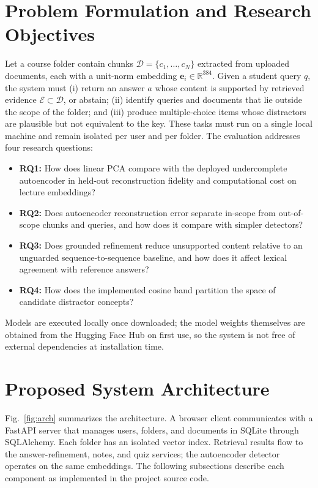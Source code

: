 \documentclass[conference]{IEEEtran}
\begin{document}
\section{Problem Formulation and Research Objectives}
Let a course folder contain chunks $\mathcal{D}=\{c_1,\dots,c_N\}$ extracted from uploaded documents, each with a unit-norm embedding $\mathbf{e}_i\in\mathbb{R}^{384}$. Given a student query $q$, the system must (i) return an answer $a$ whose content is supported by retrieved evidence $\mathcal{E}\subset\mathcal{D}$, or abstain; (ii) identify queries and documents that lie outside the scope of the folder; and (iii) produce multiple-choice items whose distractors are plausible but not equivalent to the key. These tasks must run on a single local machine and remain isolated per user and per folder. The evaluation addresses four research questions:

\begin{itemize}
\item \textbf{RQ1:} How does linear PCA compare with the deployed undercomplete autoencoder in held-out reconstruction fidelity and computational cost on lecture embeddings?
\item \textbf{RQ2:} Does autoencoder reconstruction error separate in-scope from out-of-scope chunks and queries, and how does it compare with simpler detectors?
\item \textbf{RQ3:} Does grounded refinement reduce unsupported content relative to an unguarded sequence-to-sequence baseline, and how does it affect lexical agreement with reference answers?
\item \textbf{RQ4:} How does the implemented cosine band partition the space of candidate distractor concepts?
\end{itemize}
Models are executed locally once downloaded; the model weights themselves are obtained from the Hugging Face Hub on first use, so the system is not free of external dependencies at installation time.

\section{Proposed System Architecture}
Fig.~\ref{fig:arch} summarizes the architecture. A browser client communicates with a FastAPI server that manages users, folders, and documents in SQLite through SQLAlchemy. Each folder has an isolated vector index. Retrieval results flow to the answer-refinement, notes, and quiz services; the autoencoder detector operates on the same embeddings. The following subsections describe each component as implemented in the project source code.
\end{document}
